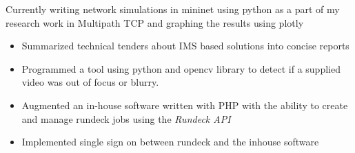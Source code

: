 \documentclass[10pt,a4paper]{altacv}
\begin{document}


\begin{fullwidth}
\makecvheader
\end{fullwidth}


Currently writing network simulations in mininet using python as a part of my research work in Multipath TCP and graphing the results using plotly
\divider

\begin{itemize}
    \item Summarized technical tenders about IMS based solutions into concise reports
    \item Programmed a tool using python and opencv library  to detect if a supplied video was out of focus or blurry. 
\end{itemize}
\divider

\begin{itemize}
    \item Augmented an in-house software written with PHP with the ability to create and manage rundeck jobs using the \emph{Rundeck API}
    \item Implemented single sign on between rundeck and the inhouse software
\end{itemize}
\divider
\end{document}
